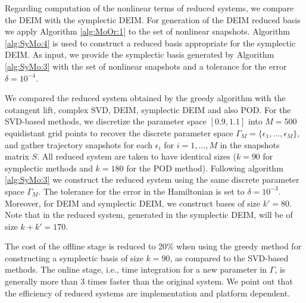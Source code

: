 Regarding computation of the nonlinear terms of reduced systems, {\edit we} compare the DEIM with the symplectic DEIM. For generation of the DEIM reduced basis we apply Algorithm \ref{alg:MoOr:1} to the set of nonlinear snapshots. Algorithm \ref{alg:SyMo:4} is used to construct a reduced basis appropriate for the symplectic DEIM. As input, we provide the symplectic basis generated by Algorithm \ref{alg:SyMo:3} with the set of nonlinear snapshots and a tolerance for the error $\delta = 10^{-4}$.

We compared the reduced system obtained by the greedy algorithm with the cotangent lift, complex SVD, DEIM, symplectic DEIM and also POD. For the SVD-based methods, we discretize the parameter space $[0.9,1.1]$ into $M=500$ equidistant grid points to recover the discrete parameter space $\Gamma_M = \{\epsilon_1,\dots,\epsilon_M \}$, and gather trajectory snapshots for each $\epsilon_i$ for $i = 1,\dots,M$ in the snapshots matrix $S$. All reduced system are taken to have identical sizes ($k=90$ for symplectic methods and $k=180$ for the POD method). Following algorithm \ref{alg:SyMo:3} we construct the reduced system using the same discrete parameter space $\Gamma_M$. The tolerance for the error in the Hamiltonian is set to $\delta = 10^{-3}$. Moreover, for DEIM and symplectic DEIM, we construct bases of size $k'=80$. Note that in the reduced system, generated in the symplectic DEIM, will be of size $k+k'=170$.

The cost of the offline stage is reduced to 20\% when using the greedy method for constructing a symplectic basis of size $k=90$, as compared to the SVD-based methods. The online stage, i.e., time integration for a new parameter in $\Gamma$, is generally more than 3 times faster than the original system. We point out that the efficiency of reduced systems are implementation and platform dependent.


